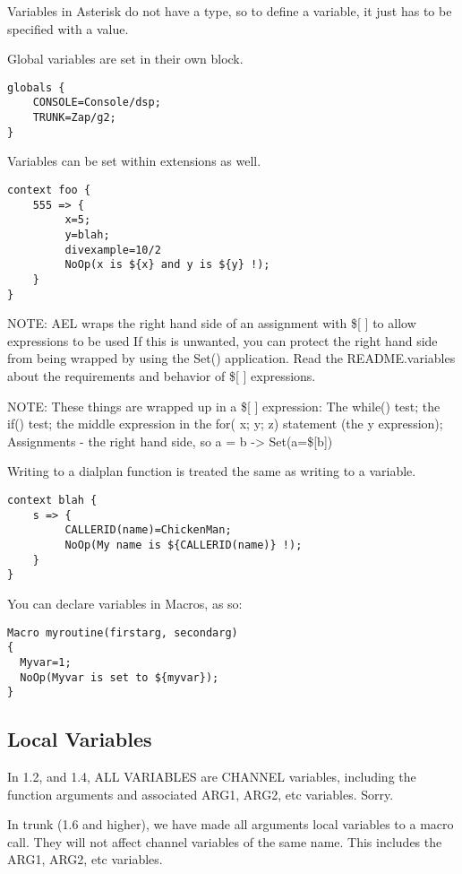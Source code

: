 {Variables in Asterisk do not have a type, so to define a variable, it
just has to be specified with a value.

Global variables are set in their own block.

\begin{verbatim}
globals {
    CONSOLE=Console/dsp;
    TRUNK=Zap/g2;
}
\end{verbatim}


Variables can be set within extensions as well.

\begin{verbatim}
context foo {
    555 => {
         x=5;
         y=blah;
         divexample=10/2
         NoOp(x is ${x} and y is ${y} !);
    }
}
\end{verbatim}

NOTE: AEL wraps the right hand side of an assignment with \$[ ] to allow
expressions to be used If this is unwanted, you can protect the right hand
side from being wrapped by using the Set() application.
Read the README.variables about the requirements and behavior
of \$[ ] expressions.

NOTE: These things are wrapped up in a \$[ ] expression: The while() test;
the if() test; the middle expression in the for( x; y; z) statement
(the y expression); Assignments - the right hand side, so a = b -> Set(a=\$[b])

Writing to a dialplan function is treated the same as writing to a variable.

\begin{verbatim}
context blah {
    s => {
         CALLERID(name)=ChickenMan;
         NoOp(My name is ${CALLERID(name)} !);
    }
}
\end{verbatim}

You can declare variables in Macros, as so:

\begin{verbatim}
Macro myroutine(firstarg, secondarg)
{
  Myvar=1;
  NoOp(Myvar is set to ${myvar});
}
\end{verbatim}

\subsection{Local Variables}

In 1.2, and 1.4, ALL VARIABLES are CHANNEL variables, including the function
arguments and associated ARG1, ARG2, etc variables. Sorry.

In trunk (1.6 and higher), we have made all arguments local variables to
a macro call. They will not affect channel variables of the same name.
This includes the ARG1, ARG2, etc variables.

}

